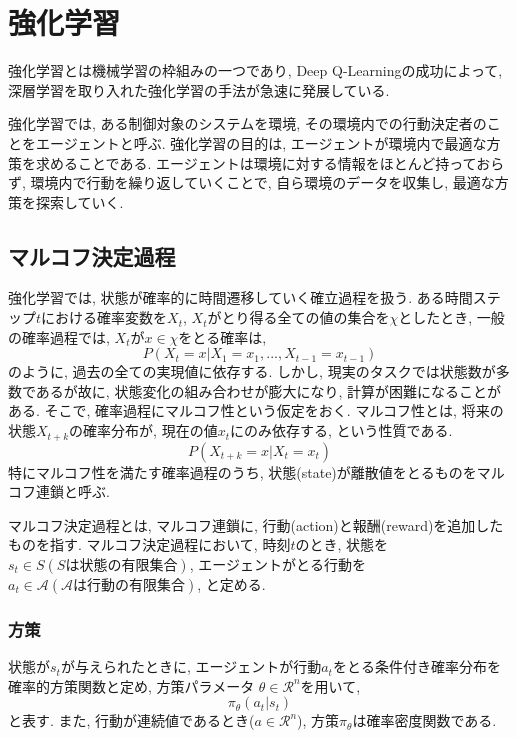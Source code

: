 \documentclass[../main]{subfiles}
\begin{document}
\newpage
\chapter{強化学習}
\label{chap:RL}
強化学習とは機械学習の枠組みの一つであり, 
Deep Q-Learning\cite{ref:dqn}の成功によって, 
深層学習を取り入れた強化学習の手法が急速に発展している.

強化学習では, ある制御対象のシステムを環境, 
その環境内での行動決定者のことをエージェントと呼ぶ.
強化学習の目的は, 
エージェントが環境内で最適な方策を求めることである.
エージェントは環境に対する情報をほとんど持っておらず, 
環境内で行動を繰り返していくことで, 
自ら環境のデータを収集し, 最適な方策を探索していく.

\section{マルコフ決定過程}
強化学習では, 状態が確率的に時間遷移していく確立過程を扱う.
ある時間ステップ$t$における確率変数を$X_t$, 
$X_t$がとり得る全ての値の集合を$\chi$としたとき, 
一般の確率過程では, $X_t$が$x\in\chi$をとる確率は, 
\begin{equation}
P(X_t=x|X_1=x_1, ... ,X_{t-1}=x_{t-1})
\end{equation}
のように, 過去の全ての実現値に依存する.
しかし, 現実のタスクでは状態数が多数であるが故に, 
状態変化の組み合わせが膨大になり, 計算が困難になることがある.
そこで, 確率過程にマルコフ性という仮定をおく.
マルコフ性とは, 将来の状態$X_{t+k}$の確率分布が, 
現在の値$x_t$にのみ依存する, という性質である.
\begin{equation}
P(X_{t+k}=x|X_t=x_t)
\end{equation}
特にマルコフ性を満たす確率過程のうち, 
状態(state)が離散値をとるものをマルコフ連鎖と呼ぶ.

マルコフ決定過程とは, マルコフ連鎖に, 
行動(action)と報酬(reward)を追加したものを指す.
マルコフ決定過程において, 
時刻$t$のとき, 状態を$s_t \in S(Sは状態の有限集合)$, 
エージェントがとる行動を
$a_t \in \mathcal{A}(\mathcal{A}は行動の有限集合)$, 
と定める. 

\subsection{方策}
状態が$s_t$が与えられたときに, 
エージェントが行動$a_t$をとる条件付き確率分布を
確率的方策関数と定め, 方策パラメータ
$\theta \in \mathcal{R}^n$を用いて, 
\begin{equation}
\pi_\theta(a_t|s_t)
\end{equation}
と表す. また, 行動が連続値であるとき($a \in \mathcal{R}^n$),
方策$\pi_\theta$は確率密度関数である.
\end{document}

